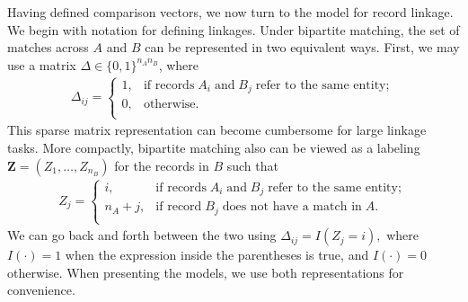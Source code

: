 \documentclass[ba]{imsart}
\begin{document}
Having defined comparison vectors, we now turn to the \cite{fellegi_theory_1969} model for record linkage.  We begin with notation for defining linkages. Under bipartite matching, the set of matches across $A$ and $B$ can be represented in two equivalent ways. First, we may use a matrix $\Delta \in \{0, 1\}^{n_An_B}$, where
\begin{align}
\Delta_{ij} =
\begin{cases}
1, & \text{if records}\;  A_i \; \text{and}\; B_j \; \text{refer to the same entity}; \\
0, & \text{otherwise}.\\
\end{cases}
\end{align}
This sparse matrix representation can become cumbersome for large linkage tasks. More compactly, bipartite matching also can be viewed as a labeling $\bm{Z} = (Z_1, \ldots, Z_{n_B})$ for the records in $B$ such that
\begin{align}
Z_{j} =
\begin{cases}
i, & \text{if records}\;  A_i \; \text{and}\; B_j  \; \text{refer to the same entity}; \\
n_A + j, & \text{if record}\;  B_j \; \text{does not have a match in}\; A. \\
\end{cases}
\end{align}
We can go back and forth between the two using $\Delta_{ij} = I(Z_j = i),$ where $I(\cdot) = 1$ when the expression inside the parentheses is true, and $I(\cdot) = 0$ otherwise. When presenting the models, we use both representations for convenience.
\end{document}
